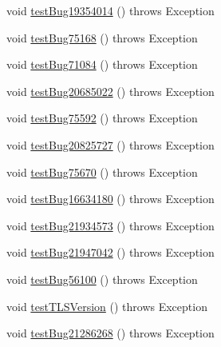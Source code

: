 \begin{DoxyCompactItemize}
\item 
void \mbox{\hyperlink{classtestsuite_1_1regression_1_1_connection_regression_test_a3eea52c252e252b39fbfb93bcc80d26a}{test\+Bug19354014}} ()  throws Exception 
\item 
void \mbox{\hyperlink{classtestsuite_1_1regression_1_1_connection_regression_test_a481102d0bf994ee0a48b67f1a1328c43}{test\+Bug75168}} ()  throws Exception 
\item 
void \mbox{\hyperlink{classtestsuite_1_1regression_1_1_connection_regression_test_aa979b5c63116b99ad91121c84a0af973}{test\+Bug71084}} ()  throws Exception 
\item 
void \mbox{\hyperlink{classtestsuite_1_1regression_1_1_connection_regression_test_a1a63a52aeb982d168ebee3c0cb30bc59}{test\+Bug20685022}} ()  throws Exception 
\item 
void \mbox{\hyperlink{classtestsuite_1_1regression_1_1_connection_regression_test_a665407a24ed690a64058e8f86c4d6063}{test\+Bug75592}} ()  throws Exception 
\item 
void \mbox{\hyperlink{classtestsuite_1_1regression_1_1_connection_regression_test_a90f5472dadf388f9b00461fc39ddeb21}{test\+Bug20825727}} ()  throws Exception 
\item 
void \mbox{\hyperlink{classtestsuite_1_1regression_1_1_connection_regression_test_ae51a7e49df56ea469720a9d165fc124a}{test\+Bug75670}} ()  throws Exception 
\item 
void \mbox{\hyperlink{classtestsuite_1_1regression_1_1_connection_regression_test_a93aad983034e220127a84017e297d492}{test\+Bug16634180}} ()  throws Exception 
\item 
void \mbox{\hyperlink{classtestsuite_1_1regression_1_1_connection_regression_test_a1cbe215e0e75477350d50bfaa49af95e}{test\+Bug21934573}} ()  throws Exception 
\item 
void \mbox{\hyperlink{classtestsuite_1_1regression_1_1_connection_regression_test_a071fe5a492bac37a1a3f0c9326d44ed8}{test\+Bug21947042}} ()  throws Exception 
\item 
void \mbox{\hyperlink{classtestsuite_1_1regression_1_1_connection_regression_test_a5b74dbc899a9fefe265aabac1e1818ce}{test\+Bug56100}} ()  throws Exception 
\item 
void \mbox{\hyperlink{classtestsuite_1_1regression_1_1_connection_regression_test_a8a5b38389d6365d90769f30887196749}{test\+T\+L\+S\+Version}} ()  throws Exception 
\item 
void \mbox{\hyperlink{classtestsuite_1_1regression_1_1_connection_regression_test_ab5a03581f2da17e71bf3d9449439c888}{test\+Bug21286268}} ()  throws Exception 

\end{DoxyCompactItemize}
